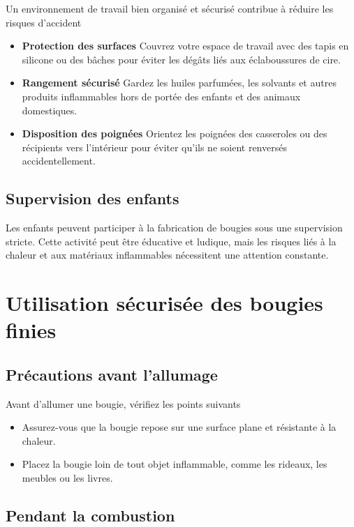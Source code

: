 \documentclass[11pt,fleqn,onecolumn,oneside]{book}
\begin{document}
Un environnement de travail bien organisé et sécurisé contribue à réduire les risques d’accident
\begin{itemize}
    \item \textbf{Protection des surfaces} Couvrez votre espace de travail avec des tapis en silicone ou des bâches pour éviter les dégâts liés aux éclaboussures de cire.
    \item \textbf{Rangement sécurisé} Gardez les huiles parfumées, les solvants et autres produits inflammables hors de portée des enfants et des animaux domestiques.
    \item \textbf{Disposition des poignées} Orientez les poignées des casseroles ou des récipients vers l’intérieur pour éviter qu’ils ne soient renversés accidentellement.
\end{itemize}

\subsection*{Supervision des enfants}

Les enfants peuvent participer à la fabrication de bougies sous une supervision stricte. Cette activité peut être éducative et ludique, mais les risques liés à la chaleur et aux matériaux inflammables nécessitent une attention constante.

\section{Utilisation sécurisée des bougies finies}

\subsection*{Précautions avant l’allumage}

Avant d’allumer une bougie, vérifiez les points suivants
\begin{itemize}
    \item Assurez-vous que la bougie repose sur une surface plane et résistante à la chaleur.
    \item Placez la bougie loin de tout objet inflammable, comme les rideaux, les meubles ou les livres.
\end{itemize}

\subsection*{Pendant la combustion}
\end{document}
